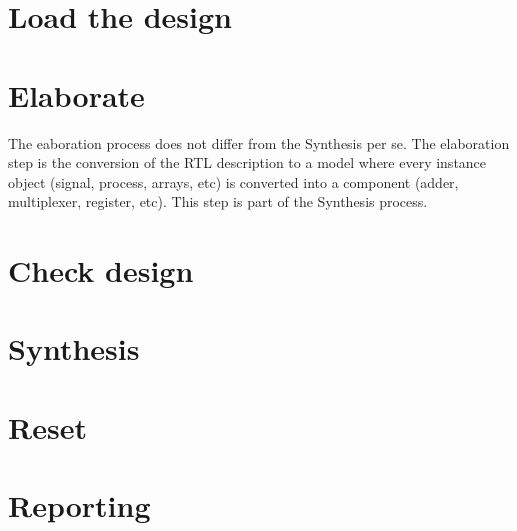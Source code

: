 \documentclass[a4paper]{article}
\begin{document}
\section{Load the design}

\section{Elaborate}

The eaboration process does not differ from the Synthesis per se. The elaboration step
is the conversion of the RTL description to a model where every instance object (signal,
process, arrays, etc) is converted into a component (adder, multiplexer, register, etc).
This step is part of the Synthesis process.

\section{Check design}

\section{Synthesis}

\section{Reset}

\section{Reporting}
\end{document}
